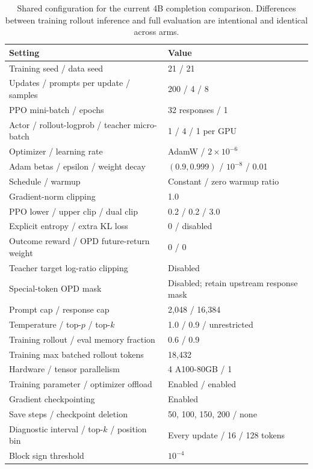 \begin{table}[h]
\caption{Shared configuration for the current 4B completion comparison. Differences between training rollout inference and full evaluation are intentional and identical across arms.}
\centering\small
\begin{tabular}{@{}p{2.5in}p{2.65in}@{}}
\toprule
Setting & Value \\
\midrule
Training seed / data seed & 21 / 21 \\
Updates / prompts per update / samples & 200 / 4 / 8 \\
PPO mini-batch / epochs & 32 responses / 1 \\
Actor / rollout-logprob / teacher micro-batch & 1 / 4 / 1 per GPU \\
Optimizer / learning rate & AdamW / $2\times10^{-6}$ \\
Adam betas / epsilon / weight decay & $(0.9,0.999)$ / $10^{-8}$ / 0.01 \\
Schedule / warmup & Constant / zero warmup ratio \\
Gradient-norm clipping & 1.0 \\
PPO lower / upper clip / dual clip & 0.2 / 0.2 / 3.0 \\
Explicit entropy / extra KL loss & 0 / disabled \\
Outcome reward / OPD future-return weight & 0 / 0 \\
Teacher target log-ratio clipping & Disabled \\
Special-token OPD mask & Disabled; retain upstream response mask \\
Prompt cap / response cap & 2,048 / 16,384 \\
Temperature / top-$p$ / top-$k$ & 1.0 / 0.9 / unrestricted \\
Training rollout / eval memory fraction & 0.6 / 0.9 \\
Training max batched rollout tokens & 18,432 \\
Hardware / tensor parallelism & 4 A100-80GB / 1 \\
Training parameter / optimizer offload & Enabled / enabled \\
Gradient checkpointing & Enabled \\
Save steps / checkpoint deletion & 50, 100, 150, 200 / none \\
Diagnostic interval / top-$k$ / position bin & Every update / 16 / 128 tokens \\
Block sign threshold & $10^{-4}$ \\
\bottomrule
\end{tabular}
\end{table}

